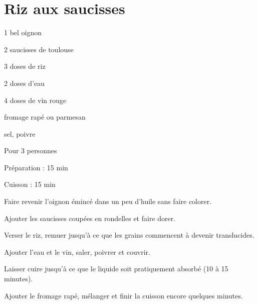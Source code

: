 \section[\normalsize{Riz aux saucisses}]{Riz aux saucisses}

\begin{ingredients}
\item 1 bel oignon
\item 2 saucisses de toulouse
\item 3 doses de riz
\item 2 doses d'eau
\item 4 doses de vin rouge
\item fromage rap\'e ou parmesan
\item sel, poivre
\end{ingredients}
\begin{infos}
\item Pour 3 personnes
\item Préparation : 15 min
\item Cuisson : 15 min
\end{infos}
\begin{etapes}
\item Faire revenir l'oignon \'eminc\'e dans un peu d'huile sans faire colorer. 
\item Ajouter les saucisses coup\'ees en rondelles et faire dorer. \item Verser le riz, remuer jusqu'\`a ce que les grains commencent \`a devenir translucides. 
\item Ajouter l'eau et le vin, saler, poivrer et couvrir. 
\item Laisser cuire jusqu'\`a ce que le liquide soit pratiquement absorb\'e (10 \`a 15 minutes). 
\item Ajouter le fromage rap\'e, m\'elanger et finir la cuisson encore quelques minutes.
\end{etapes}
\begin{conseils}
\end{conseils}
